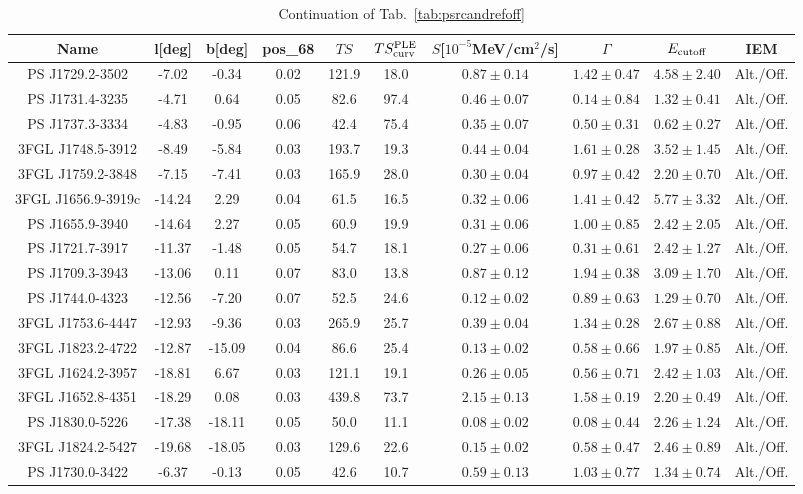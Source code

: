 \begin{table*}
\center
\begin{tabular}{|c|c|c|c|c|c|c|c|c|c|}
\hline
Name & l[deg]& b[deg] & pos\_68 & $TS$  & $TS^{\rm{PLE}}_{\rm{curv}}$  & $S$[$10^{-5}$MeV/cm$^2$/s] & $\Gamma$ & $E_{\rm{cutoff}}$ & IEM\\
\hline
\hline
 PS J1729.2-3502 & -7.02 & -0.34 & 0.02 & 121.9 & 18.0 & $0.87\pm0.14$ & $1.42\pm0.47$ & $4.58\pm2.40$ & Alt./Off.\\
\hline 
 PS J1731.4-3235 & -4.71 & 0.64 & 0.05 & 82.6 & 97.4 & $0.46\pm0.07$ & $0.14\pm0.84$ & $1.32\pm0.41$ & Alt./Off.\\
\hline 
 PS J1737.3-3334 & -4.83 & -0.95 & 0.06 & 42.4 & 75.4 & $0.35\pm0.07$ & $0.50\pm0.31$ & $0.62\pm0.27$ & Alt./Off.\\
\hline 
 3FGL J1748.5-3912 & -8.49 & -5.84 & 0.03 & 193.7 & 19.3 & $0.44\pm0.04$ & $1.61\pm0.28$ & $3.52\pm1.45$ & Alt./Off.\\
\hline 
 3FGL J1759.2-3848 & -7.15 & -7.41 & 0.03 & 165.9 & 28.0 & $0.30\pm0.04$ & $0.97\pm0.42$ & $2.20\pm0.70$ & Alt./Off.\\
\hline 
 3FGL J1656.9-3919c & -14.24 & 2.29 & 0.04 & 61.5 & 16.5 & $0.32\pm0.06$ & $1.41\pm0.42$ & $5.77\pm3.32$ & Alt./Off.\\
\hline 
 PS J1655.9-3940 & -14.64 & 2.27 & 0.05 & 60.9 & 19.9 & $0.31\pm0.06$ & $1.00\pm0.85$ & $2.42\pm2.05$ & Alt./Off.\\
\hline 
 PS J1721.7-3917 & -11.37 & -1.48 & 0.05 & 54.7 & 18.1 & $0.27\pm0.06$ & $0.31\pm0.61$ & $2.42\pm1.27$ & Alt./Off.\\
\hline 
 PS J1709.3-3943 & -13.06 & 0.11 & 0.07 & 83.0 & 13.8 & $0.87\pm0.12$ & $1.94\pm0.38$ & $3.09\pm1.70$ & Alt./Off.\\
\hline 
 PS J1744.0-4323 & -12.56 & -7.20 & 0.07 & 52.5 & 24.6 & $0.12\pm0.02$ & $0.89\pm0.63$ & $1.29\pm0.70$ & Alt./Off.\\
\hline 
 3FGL J1753.6-4447 & -12.93 & -9.36 & 0.03 & 265.9 & 25.7 & $0.39\pm0.04$ & $1.34\pm0.28$ & $2.67\pm0.88$ & Alt./Off.\\
\hline 
 3FGL J1823.2-4722 & -12.87 & -15.09 & 0.04 & 86.6 & 25.4 & $0.13\pm0.02$ & $0.58\pm0.66$ & $1.97\pm0.85$ & Alt./Off.\\
\hline 
 3FGL J1624.2-3957 & -18.81 & 6.67 & 0.03 & 121.1 & 19.1 & $0.26\pm0.05$ & $0.56\pm0.71$ & $2.42\pm1.03$ & Alt./Off.\\
\hline 
 3FGL J1652.8-4351 & -18.29 & 0.08 & 0.03 & 439.8 & 73.7 & $2.15\pm0.13$ & $1.58\pm0.19$ & $2.20\pm0.49$ & Alt./Off.\\
\hline 
 PS J1830.0-5226 & -17.38 & -18.11 & 0.05 & 50.0 & 11.1 & $0.08\pm0.02$ & $0.08\pm0.44$ & $2.26\pm1.24$ & Alt./Off.\\
\hline 
 3FGL J1824.2-5427 & -19.68 & -18.05 & 0.03 & 129.6 & 22.6 & $0.15\pm0.02$ & $0.58\pm0.47$ & $2.46\pm0.89$ & Alt./Off.\\
\hline 
 PS J1730.0-3422 & -6.37 & -0.13 & 0.05 & 42.6 & 10.7 & $0.59\pm0.13$ & $1.03\pm0.77$ & $1.34\pm0.74$ & Alt./Off.\\
\hline
\hline
\end{tabular}
\caption{Continuation of Tab.~\ref{tab:psrcandrefoff}}
\label{tab:psrcandrefoffcont}
\end{table*}
